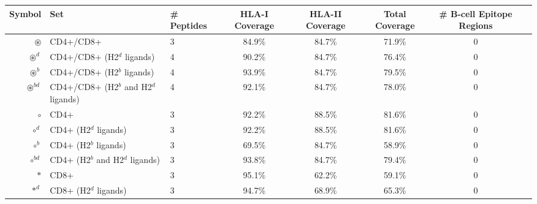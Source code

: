 \begin{tabular}{rllccccc}
\toprule
                                              Symbol &                                      Set &  \# Peptides & HLA-I Coverage & HLA-II Coverage & Total Coverage &  \# B-cell Epitope Regions \\
\midrule
                                     $ \circledast $ &                                CD4+/CD8+ &            3 &         84.9\% &          84.7\% &         71.9\% &                          0 \\
                                   $ \circledast^d $ &               CD4+/CD8+ (H2$^d$ ligands) &            4 &         90.2\% &          84.7\% &         76.4\% &                          0 \\
                                   $ \circledast^b $ &               CD4+/CD8+ (H2$^b$ ligands) &            4 &         93.9\% &          84.7\% &         79.5\% &                          0 \\
                                $ \circledast^{bd} $ &    CD4+/CD8+ (H2$^b$ and H2$^d$ ligands) &            4 &         92.1\% &          84.7\% &         78.0\% &                          0 \\
                                           $ \circ $ &                                     CD4+ &            3 &         92.2\% &          88.5\% &         81.6\% &                          0 \\
                                         $ \circ^d $ &                    CD4+ (H2$^d$ ligands) &            3 &         92.2\% &          88.5\% &         81.6\% &                          0 \\
                                         $ \circ^b $ &                    CD4+ (H2$^b$ ligands) &            3 &         69.5\% &          84.7\% &         58.9\% &                          0 \\
                                      $ \circ^{bd} $ &         CD4+ (H2$^b$ and H2$^d$ ligands) &            3 &         93.8\% &          84.7\% &         79.4\% &                          0 \\
                                            $ \ast $ &                                     CD8+ &            3 &         95.1\% &          62.2\% &         59.1\% &                          0 \\
                                          $ \ast^d $ &                    CD8+ (H2$^d$ ligands) &            3 &         94.7\% &          68.9\% &         65.3\% &                          0 \\

\end{tabular}
